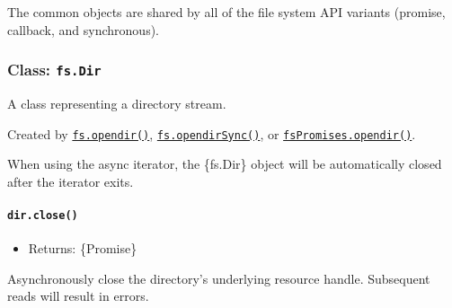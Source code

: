 The common objects are shared by all of the file system API variants
(promise, callback, and synchronous).

\subsubsection{\texorpdfstring{Class:
\texttt{fs.Dir}}{Class: fs.Dir}}\label{class-fs.dir}

A class representing a directory stream.

Created by
\hyperref[fsopendirpath-options-callback]{\texttt{fs.opendir()}},
\hyperref[fsopendirsyncpath-options]{\texttt{fs.opendirSync()}}, or
\hyperref[fspromisesopendirpath-options]{\texttt{fsPromises.opendir()}}.

\begin{Shaded}
\begin{Highlighting}[]
 \OperatorTok{;}

\NormalTok{ \{}
  \OperatorTok{=}  \NormalTok{(}\NormalTok{)}\OperatorTok{;}
   \NormalTok{ (}
    \NormalTok{)}\OperatorTok{;}
\NormalTok{\} }
  \OperatorTok{;}
\NormalTok{\}}
\end{Highlighting}
\end{Shaded}

When using the async iterator, the \{fs.Dir\} object will be
automatically closed after the iterator exits.

\paragraph{\texorpdfstring{\texttt{dir.close()}}{dir.close()}}\label{dir.close}

\begin{itemize}
\tightlist
\item
  Returns: \{Promise\}
\end{itemize}

Asynchronously close the directory's underlying resource handle.
Subsequent reads will result in errors.

